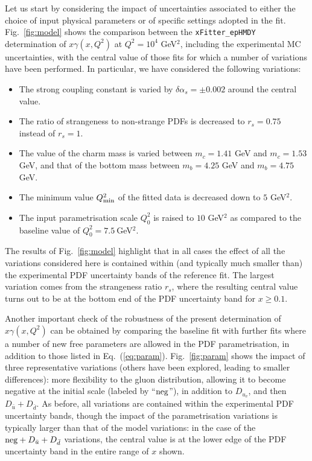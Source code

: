 Let us start by considering the impact of uncertainties associated to either
the choice of input physical parameters or of specific settings
adopted in the fit.
%
Fig.~\ref{fig:model} shows the comparison between the
{\tt xFitter\_epHMDY} 
determination of $x\gamma(x,Q^2)$ at $Q^2=10^4$ GeV$^2$, including the experimental MC
uncertainties, with the central
value of those fits for which a number of variations have been
performed.
%
In particular, we have considered the following variations:
\begin{itemize}
\item The strong coupling constant is varied by $\delta \alpha_s=\pm 0.002$ around the central value.
\item The ratio of strangeness to non-strange PDFs is decreased to $r_s=0.75$ instead of $r_s=1$.
\item The value of the charm mass is varied between $m_c=1.41$ GeV and $m_c=1.53$ GeV,
  and that of the bottom mass between $m_b=4.25$ GeV and $m_b=4.75$ GeV.
\item The minimum value $Q_{\rm min}^2$ of the fitted data is decreased down to $5$ GeV$^2$.
\item The input parametrisation scale $Q_0^2$ is raised to $10$ GeV$^2$ as compared
  to the baseline value of $Q_0^2=7.5~$GeV$^2$.
\end{itemize}
The results of Fig.~\ref{fig:model} highlight that in all cases the effect
of all the variations considered here is contained within (and typically much smaller than) 
the experimental PDF uncertainty bands of the reference fit.
%
The largest variation comes from the strangeness ratio $r_s$, where the resulting
central value turns out to be at the bottom end of the PDF uncertainty band for $x\ge 0.1$.

Another important check of the robustness of the present determination of
$x\gamma(x, Q^2)$ can be obtained by comparing the baseline fit with further
fits where a number of new free parameters are allowed in the PDF
parametrisation, in addition to those listed in Eq.~(\ref{eq:param}).
%
Fig.~\ref{fig:param} shows the impact of three representative
variations (others have been explored, leading to smaller
differences): more flexibility to the gluon distribution, allowing it
to become negative at the initial scale (labeled by ``${\rm neg}$''), in addition to $D_{u_v}$,
and then $D_{\bar{u}}+D_{\bar{d}}$.
%
As before, all variations are contained within the experimental PDF uncertainty
bands, though the impact of the parametrisation variations is typically larger
than that of the model variations: in the case of the
${\rm neg}+D_{\bar{u}}+D_{\bar{d}}$ variations, the central value is
at the lower edge of the PDF uncertainty band in the entire range
of $x$ shown.
%

